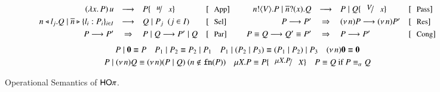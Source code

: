 \begin{figure}[!t]
\[
	\begin{array}{rcllcrcll}
		\appl{(\abs{x}{P})}{u}  & \red & P \subst{u}{x} 
		& \orule{App}
		&&
		\bout{n}{V} P \Par \binp{\dual{n}}{x} Q & \red & P \Par Q \subst{V}{x} 
		& \orule{Pass}
		\\[1mm]

		\bsel{n}{l_j} Q \Par \bbra{\dual{n}}{l_i : P_i}_{i \in I} & \red & Q \Par P_j ~~(j \in I)~~ 
		& \orule{Sel}
		&&
		P \red P' & \Rightarrow & \news{n} P  \red  \news{n} P' 
		& \orule{Res}
		\\[1mm]

		P \red P' & \Rightarrow  &  P \Par Q  \red   P' \Par Q  
		& \orule{Par}
		&&
		P \scong Q \red Q' \scong P' & \Rightarrow & P  \red  P'
		& \orule{Cong}
	\end{array}
\]
{\small
\[
	\begin{array}{c}
		P \Par \inact \scong P
		\quad
		P_1 \Par P_2 \scong P_2 \Par P_1
		\quad
		P_1 \Par (P_2 \Par P_3) \scong (P_1 \Par P_2) \Par P_3
		\quad
		\news{n} \inact \scong \inact
		\\[1mm]
		P \Par \news{n} Q \scong \news{n}(P \Par Q)
		\ (n \notin \fn{P})
		\quad 
		\recp{X}{P} \scong P\subst{\recp{X}{P}}{\rvar{X}}
		\quad
		P \scong Q \textrm{ if } P \scong_\alpha Q
	\end{array}
\]
}
\caption{Operational Semantics of $\mathsf{HO}\pi$. 
\label{fig:reduction}}
\end{figure}


